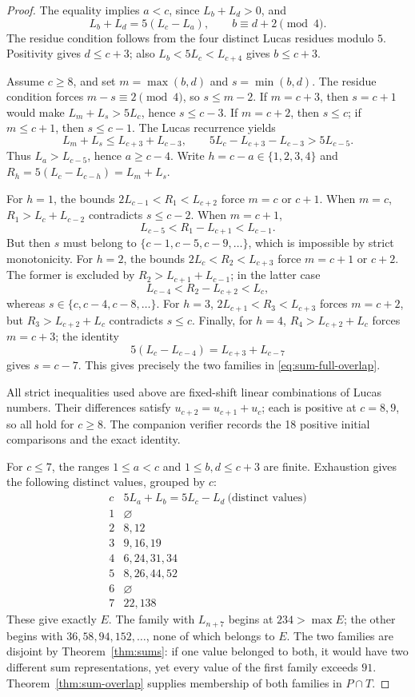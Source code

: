 \documentclass[11pt]{article}
\begin{document}
\begin{proof}
The equality implies $a<c$, since $L_b+L_d>0$, and
\begin{equation}\label{eq:sum-overlap-condition}
L_b+L_d=5(L_c-L_a),\qquad b\equiv d+2\pmod4.
\end{equation}
The residue condition follows from the four distinct Lucas
residues modulo $5$. Positivity gives $d\le c+3$; also
$L_b<5L_c<L_{c+4}$ gives $b\le c+3$.

Assume $c\ge8$, and set $m=\max(b,d)$ and $s=\min(b,d)$.
The residue condition forces $m-s\equiv2\pmod4$,
so $s\le m-2$. If $m=c+3$, then $s=c+1$ would
make $L_m+L_s>5L_c$, hence $s\le c-3$.
If $m=c+2$, then $s\le c$; if $m\le c+1$, then
$s\le c-1$. The Lucas recurrence yields
\[
L_m+L_s\le L_{c+3}+L_{c-3},\qquad
5L_c-L_{c+3}-L_{c-3}>5L_{c-5}.
\]
Thus $L_a>L_{c-5}$, hence $a\ge c-4$.
Write $h=c-a\in\{1,2,3,4\}$ and
$R_h=5(L_c-L_{c-h})=L_m+L_s$.

For $h=1$, the bounds
$2L_{c-1}<R_1<L_{c+2}$ force $m=c$ or $c+1$.
When $m=c$, $R_1>L_c+L_{c-2}$ contradicts $s\le c-2$.
When $m=c+1$,
\[
L_{c-5}<R_1-L_{c+1}<L_{c-1}.
\]
But then $s$ must belong to $\{c-1,c-5,c-9,\ldots\}$,
which is impossible by strict monotonicity.
For $h=2$, the bounds $2L_c<R_2<L_{c+3}$
force $m=c+1$ or $c+2$. The former is excluded by
$R_2>L_{c+1}+L_{c-1}$; in the latter case
\[
L_{c-4}<R_2-L_{c+2}<L_c,
\]
whereas $s\in\{c,c-4,c-8,\ldots\}$.
For $h=3$, $2L_{c+1}<R_3<L_{c+3}$ forces
$m=c+2$, but $R_3>L_{c+2}+L_c$ contradicts $s\le c$.
Finally, for $h=4$, $R_4>L_{c+2}+L_c$ forces
$m=c+3$; the identity
\[
5(L_c-L_{c-4})=L_{c+3}+L_{c-7}
\]
gives $s=c-7$. This gives precisely the two families
in \eqref{eq:sum-full-overlap}.

All strict inequalities used above are fixed-shift linear
combinations of Lucas numbers. Their differences satisfy
$u_{c+2}=u_{c+1}+u_c$; each is positive at $c=8,9$,
so all hold for $c\ge8$. The companion verifier records
the 18 positive initial comparisons and the exact identity.

For $c\le7$, the ranges $1\le a<c$ and
$1\le b,d\le c+3$ are finite. Exhaustion gives the
following distinct values, grouped by $c$:
\[
\begin{array}{c|l}
c &5L_a+L_b=5L_c-L_d\ \text{(distinct values)}\\ \hline
1&\varnothing\\
2&8,12\\
3&9,16,19\\
4&6,24,31,34\\
5&8,26,44,52\\
6&\varnothing\\
7&22,138
\end{array}
\]
These give exactly $E$. The family with $L_{n+7}$
begins at $234>\max E$; the other begins with
$36,58,94,152,\ldots$, none of which belongs to $E$.
The two families are disjoint by Theorem~\ref{thm:sums}:
if one value belonged to both, it would have two different
sum representations, yet every value of the first family
exceeds $91$. Theorem~\ref{thm:sum-overlap} supplies
membership of both families in $P\cap T$.
\end{proof}
\end{document}
